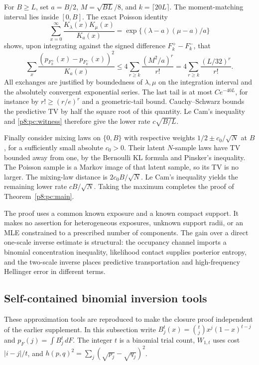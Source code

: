 \documentclass[11pt,a4paper]{article}
\theoremstyle{definition}
\theoremstyle{remark}
\numberwithin{equation}{section}
\begin{document}
For $B\ge L$, set $a=B/2$, $M=\sqrt{BL}/8$, and
$k=\lceil20L\rceil$.  The moment-matching interval lies inside
$[0,B]$.  The exact Poisson identity
\[
 \sum_{x=0}^\infty\frac{K_\lambda(x)K_\mu(x)}{K_a(x)}
                   =\exp\{(\lambda-a)(\mu-a)/a\}
\]
shows, upon integrating against the signed difference $F_k^+-F_k^-$,
that
\[
 \sum_x\frac{(p_{F_k^+}(x)-p_{F_k^-}(x))^2}{K_a(x)}
 \le4\sum_{r\ge k}\frac{(M^2/a)^r}{r!}
 =4\sum_{r\ge k}\frac{(L/32)^r}{r!}.
\]
All exchanges are justified by boundedness of $\lambda,\mu$ on
the integration interval and the absolutely convergent exponential
series.  The last tail is at most $Ce^{-40L}$, for instance by
$r!\ge(r/e)^r$ and a geometric-tail bound.  Cauchy--Schwarz bounds
the predictive TV by half the square root of this quantity.
Le Cam's inequality and \eqref{p8:pc:witness} therefore give the
lower rate $c\sqrt{B/L}$.

Finally consider mixing laws on $\{0,B\}$ with respective weights
$1/2\pm c_0/\sqrt N$ at $B$, for a sufficiently small absolute
$c_0>0$.  Their latent $N$-sample laws have TV bounded away from
one, by the Bernoulli KL formula and Pinsker's inequality.  The
Poisson sample is a Markov image of that latent sample, so its TV
is no larger.  The mixing-law distance is $2c_0B/\sqrt N$.
Le Cam's inequality yields the remaining lower rate $cB/\sqrt N$.
Taking the maximum completes the proof of Theorem~\ref{p8:pc:main}.

The proof uses a common known exposure and a known compact support.
It makes no assertion for heterogeneous exposures, unknown support
radii, or an MLE constrained to a prescribed number of components.
The gain over a direct one-scale inverse estimate is structural:
the occupancy channel imports a binomial concentration inequality,
likelihood contact supplies posterior entropy, and the two-scale
inverse places predictive transportation and high-frequency
Hellinger error in different terms.

\subsection{Self-contained binomial inversion tools}
\label{p8:pc:binomialtools}

These approximation tools are reproduced to make the closure proof
independent of the earlier supplement. In this subsection write
$B_j^t(x)=\binom tjx^j(1-x)^{t-j}$ and
$p_F(j)=\int B_j^t\,dF$. The integer $t$ is a binomial trial count,
$W_{1,t}$ uses cost $|i-j|/t$, and
$h(p,q)^2=\sum_j(\sqrt{p_j}-\sqrt{q_j})^2$.
\end{document}
